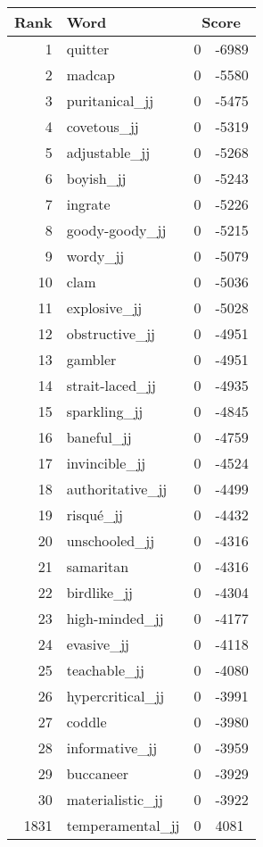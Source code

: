 \begin{longtable}[!htbp]{| rlr@{.}l |}
    \hline
    \textbf{Rank} & \textbf{Word} & \multicolumn{2}{c|}{\textbf{Score}} \\
    \hline
    \endhead
    1 & quitter & 0 & -6989 \\
    2 & madcap & 0 & -5580 \\
    3 & puritanical\_jj & 0 & -5475 \\
    4 & covetous\_jj & 0 & -5319 \\
    5 & adjustable\_jj & 0 & -5268 \\
    6 & boyish\_jj & 0 & -5243 \\
    7 & ingrate & 0 & -5226 \\
    8 & goody-goody\_jj & 0 & -5215 \\
    9 & wordy\_jj & 0 & -5079 \\
    10 & clam & 0 & -5036 \\
    11 & explosive\_jj & 0 & -5028 \\
    12 & obstructive\_jj & 0 & -4951 \\
    13 & gambler & 0 & -4951 \\
    14 & strait-laced\_jj & 0 & -4935 \\
    15 & sparkling\_jj & 0 & -4845 \\
    16 & baneful\_jj & 0 & -4759 \\
    17 & invincible\_jj & 0 & -4524 \\
    18 & authoritative\_jj & 0 & -4499 \\
    19 & risqué\_jj & 0 & -4432 \\
    20 & unschooled\_jj & 0 & -4316 \\
    21 & samaritan & 0 & -4316 \\
    22 & birdlike\_jj & 0 & -4304 \\
    23 & high-minded\_jj & 0 & -4177 \\
    24 & evasive\_jj & 0 & -4118 \\
    25 & teachable\_jj & 0 & -4080 \\
    26 & hypercritical\_jj & 0 & -3991 \\
    27 & coddle & 0 & -3980 \\
    28 & informative\_jj & 0 & -3959 \\
    29 & buccaneer & 0 & -3929 \\
    30 & materialistic\_jj & 0 & -3922 \\
    1831 & temperamental\_jj & 0 & 4081 \\

\end{longtable}
